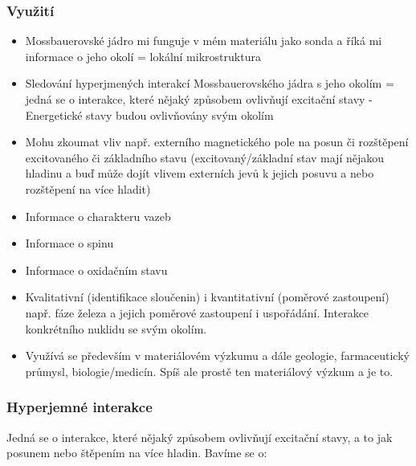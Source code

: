 %

\subsubsection{Využití}

\begin{itemize}
    \item Mossbauerovské jádro mi funguje v mém materiálu jako sonda a říká mi informace o jeho okolí = lokální mikrostruktura
    \item Sledování hyperjmených interakcí Mossbauerovského jádra s jeho okolím = jedná se o interakce, které nějaký způsobem ovlivňují excitační stavy - Energetické stavy budou ovlivňovány svým okolím
    \item Mohu zkoumat vliv např. externího magnetického pole na posun či rozštěpení excitovaného či základního stavu (excitovaný/základní stav mají nějakou hladinu a buď může dojít vlivem externích jevů k jejich posuvu a nebo rozštěpení na více hladit)
    \item Informace o charakteru vazeb
    \item Informace o spinu
    \item Informace o oxidačním stavu
    \item Kvalitativní (identifikace sloučenin) i kvantitativní (poměrové zastoupení) např. fáze železa a jejich poměrové zastoupení i uspořádání. Interakce konkrétního nuklidu se svým okolím. 
    \item Využívá se především v materiálovém výzkumu a dále geologie, farmaceutický průmysl, biologie/medicín. Spíš ale prostě ten materiálový výzkum a je to.
\end{itemize}

\subsubsection{Hyperjemné interakce}

Jedná se o interakce, které nějaký způsobem ovlivňují excitační stavy, a to jak posunem nebo štěpením na více hladin. Bavíme se o:

